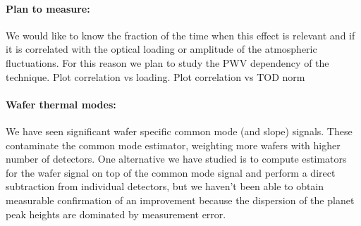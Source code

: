 \paragraph{Plan to measure:}
We would like to know the fraction of the time when this effect is relevant and if it is correlated with the optical loading or amplitude of the atmospheric fluctuations. For this reason we plan to study the PWV dependency of the technique. Plot correlation vs loading. Plot correlation vs TOD norm

\paragraph{Wafer thermal modes:}
We have seen significant wafer specific common mode (and slope) signals. These contaminate the common mode estimator, weighting more wafers with higher number of detectors. One alternative we have studied is to compute estimators for the wafer signal on top of the common mode signal and perform a direct subtraction from individual detectors, but we haven't been able to obtain measurable confirmation of an improvement because the dispersion of the planet peak heights are dominated by measurement error.
